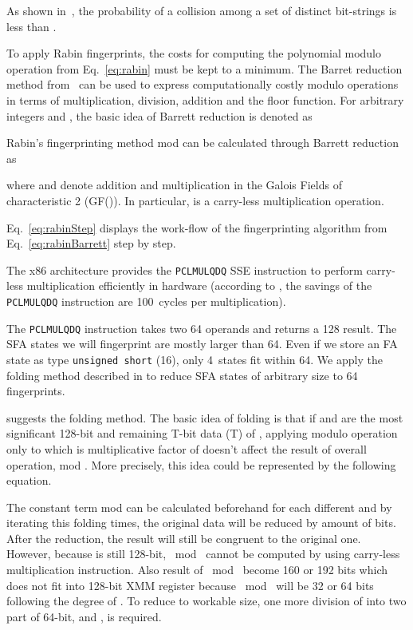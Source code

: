 \documentclass[10pt, conference, compsocconf]{IEEEtran}
\begin{document}
\noindent As shown in~\cite{Broder93}, the probability of a collision among a
set of  distinct bit-strings is less than .

To apply Rabin fingerprints, the costs for computing the
polynomial modulo operation from Eq.~\eqref{eq:rabin} must
be kept to a minimum. 
The Barret reduction method from~\cite{Barrett87} can be used
to express computationally costly modulo operations
in terms of multiplication, division, addition and the
floor function.
For arbitrary integers  and , the basic idea of Barrett reduction is
denoted as



Rabin's fingerprinting method 
mod  can be calculated through Barrett reduction as


where
 and  denote 
addition and multiplication in the Galois Fields of
characteristic 2 (GF()).
In particular,  is
a carry-less multiplication operation.



Eq.~\eqref{eq:rabinStep} displays the work-flow of the fingerprinting
algorithm from Eq.~\eqref{eq:rabinBarrett} step by step.

The x86 architecture provides the {\tt PCLMULQDQ} SSE instruction to perform
carry-less multiplication efficiently in hardware (according to
\cite{IntelCarryless}, the savings of the {\tt PCLMULQDQ}
instruction are
100~cycles per multiplication).

The {\tt PCLMULQDQ} instruction takes two
\SI{64}{\bit} operands and returns a \SI{128}{\bit} result.
The SFA states we will fingerprint are mostly larger than \SI{64}{\bit}.
Even if we store
an FA state as type {\tt unsigned short} (\SI{16}{\bit}), only 4~states fit
within \SI{64}{\bit}. We apply the folding method
described in \cite{IntelCRC} to reduce SFA states of arbitrary
size to \SI{64}{\bit} fingerprints.

\iffalse
suggests the folding method. The basic idea of
folding is that if  and  are the most
significant 128-bit and remaining T-bit data (T) of ,
applying modulo operation only to  which is multiplicative
factor of  doesn't affect the result of overall
operation,  mod . More precisely,
this idea could be represented by the following equation.



The constant term mod can be calculated
beforehand for each different  and by iterating this folding 
times, the original data  will be reduced by amount
of  bits. After the reduction, the result will still
be congruent to the original one. However, because
 is still 128-bit, ~mod~
 cannot be computed by using carry-less
multiplication instruction. Also result of 
~mod~ become 160 or 192 bits which does not fit
into 128-bit XMM register because
~mod~ will be 32 or 64 bits following the
degree of . To reduce  to workable size,
one more division of  into two part of 64-bit,
 and , is required.
\end{document}
